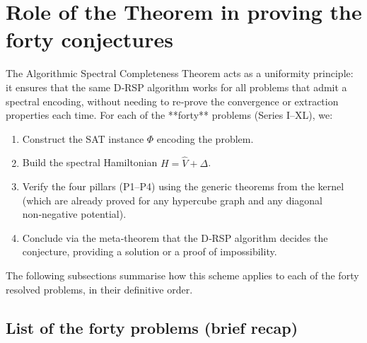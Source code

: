\documentclass[11pt,a4paper]{article}
\begin{document}
\section{Role of the Theorem in proving the forty conjectures}

The Algorithmic Spectral Completeness Theorem acts as a uniformity principle: it ensures that the same D‑RSP algorithm works for all problems that admit a spectral encoding, without needing to re‑prove the convergence or extraction properties each time. For each of the **forty** problems (Series I–XL), we:

\begin{enumerate}
\item Construct the SAT instance \(\Phi\) encoding the problem.
\item Build the spectral Hamiltonian \(H = \hat{V} +\Delta\).
\item Verify the four pillars (P1–P4) using the generic theorems from the kernel (which are already proved for any hypercube graph and any diagonal non‑negative potential).
\item Conclude via the meta‑theorem that the D‑RSP algorithm decides the conjecture, providing a solution or a proof of impossibility.
\end{enumerate}

The following subsections summarise how this scheme applies to each of the forty resolved problems, in their definitive order.

\subsection*{List of the forty problems (brief recap)}
\end{document}

